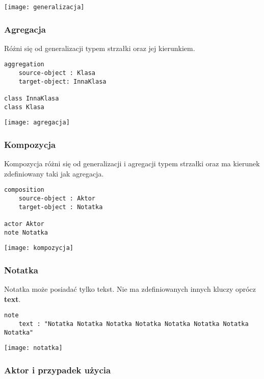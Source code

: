 \begin{center}
\texttt{[image: generalizacja]}
\end{center}

\subsubsection{Agregacja}

Różni się od generalizacji typem strzałki oraz jej kierunkiem.
\begin{lstlisting}
aggregation
    source-object : Klasa
    target-object: InnaKlasa

class InnaKlasa
class Klasa
\end{lstlisting}

\begin{center}
\texttt{[image: agregacja]}
\end{center}

\subsubsection{Kompozycja}

Kompozycja różni się od generalizacji i agregacji typem strzałki oraz ma kierunek zdefiniowany taki jak agregacja.
\begin{lstlisting}
composition 
    source-object : Aktor
    target-object : Notatka
    
actor Aktor
note Notatka
\end{lstlisting}

\begin{center}
\texttt{[image: kompozycja]}
\end{center}

\subsubsection{Notatka}

Notatka może posiadać tylko tekst. Nie ma zdefiniowanych innych kluczy oprócz \textbf{text}.
\begin{lstlisting}
note 
    text : "Notatka Notatka Notatka Notatka Notatka Notatka Notatka Notatka"
\end{lstlisting}

\begin{center}
\texttt{[image: notatka]}
\end{center}

\subsubsection{Aktor i przypadek użycia}

